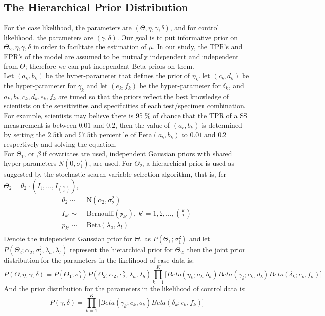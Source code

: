 \documentclass[11 pt, a4paper]{article}  %
\begin{document}
\subsection{The Hierarchical Prior Distribution}
For the case likelihood, the parameters are $(\Theta, \eta, \gamma, \delta)$, and for control likelihood, the parameters are $(\gamma, \delta)$. Our goal is to put informative prior on $\Theta_2, \eta, \gamma, \delta$ in order to facilitate the estimation of $\mu$. In our study, the TPR's and FPR's of the model are assumed to be mutually independent and independent from $\Theta$; therefore we can put independent Beta priors on them. \\

Let $(a_k,b_k)$ be the hyper-parameter that defines the prior of $\eta_k$, let $(c_k,d_k)$ be the hyper-parameter for $\gamma_k$ and let $(e_k,f_k)$ be the hyper-parameter for $\delta_k$, and  $a_k,b_k,c_k,d_k,e_k,f_k$ are tuned so that the priors reflect the best knowledge of scientists on the sensitivities and specificities of each test/specimen combination. For example, scientists may believe there is 95 $\%$ of chance that the TPR of a SS measurement is between $0.01$ and $0.2$, then the value of $(a_k,b_k)$ is determined by setting the $2.5$th and $97.5$th percentile of Beta$(a_k,b_k)$ to $0.01$ and $0.2$ respectively and solving the equation.\\

For $\Theta_1$, or {\boldmath$\beta$} if covariates are used, independent Gaussian priors with shared hyper-parameters $N(0, \sigma_1^2)$, are used. For $\Theta_2$, a hierarchical prior is used as suggested by the stochastic search variable selection algorithm, that is, for $\Theta_2 = \theta_2 \cdot (I_1, \ldots, I_{{K \choose 2}})$,
\begin{align*}
\theta_2 \sim & \text{ N}(\alpha_2, \sigma_2^2) \\
I_{k'} \sim & \text{ Bernoulli}(p_{k'}), \ k' = 1, 2, \ldots, {K \choose 2} \\
p_{k'} \sim & \text{ Beta}(\lambda_a, \lambda_b) \\
\end{align*}
Denote the independent Gaussian prior for $\Theta_1$ as $P(\Theta_1; \sigma_1^2)$ and let $P(\Theta_2; \alpha_2, \sigma_2^2, \lambda_a, \lambda_b)$ represent the hierarchical prior for $\Theta_2$, then the joint prior distribution for the parameters in the likelihood of case data is:
\[P(\Theta, \eta, \gamma, \delta) = P(\Theta_1; \sigma_1^2) P(\Theta_2; \alpha_2, \sigma_2^2, \lambda_a, \lambda_b) \prod_{k=1}^K \Big [Beta(\eta_k; a_k,b_k) Beta(\gamma_k;c_k,d_k) Beta(\delta_k;e_k,f_k) \Big ]\]
And the prior distribution for the parameters in the likelihood of control data is:
\[P( \gamma, \delta) = \prod_{k=1}^K \Big [Beta(\gamma_k; c_k,d_k ) Beta(\delta_k; e_k,f_k) \Big] \]
\end{document}
